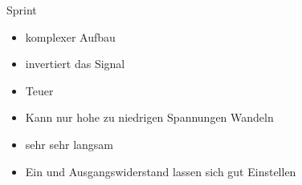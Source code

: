 
\begin{frame}[c]{Sprint}

  \begin{itemize}
    \item komplexer Aufbau
    \item invertiert das Signal
    \item Teuer
    \item Kann nur hohe zu niedrigen Spannungen Wandeln
    \item sehr sehr langsam
    \item Ein und Ausgangswiderstand lassen sich gut Einstellen
  \end{itemize}
\end{frame}
